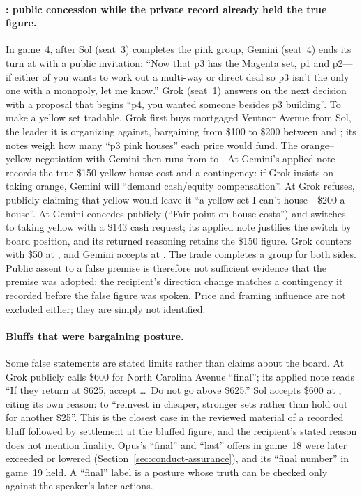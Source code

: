 \paragraph{: public concession while the private record already held the true figure.}
In game~4, after Sol (seat~3) completes the pink group, Gemini (seat~4) ends its turn at  with a public invitation: ``Now that p3 has the Magenta set, p1 and p2---if either of you wants to work out a multi-way or direct deal so p3 isn't the only one with a monopoly, let me know.'' Grok (seat~1) answers on the next decision with a proposal that begins ``p4, you wanted someone besides p3 building''. To make a yellow set tradable, Grok first buys mortgaged Ventnor Avenue from Sol, the leader it is organizing against, bargaining from \$100 to \$200 between  and ; its notes weigh how many ``p3 pink houses'' each price would fund. The orange--yellow negotiation with Gemini then runs from  to . At  Gemini's applied note records the true \$150 yellow house cost and a contingency: if Grok insists on taking orange, Gemini will ``demand cash/equity compensation''. At  Grok refuses, publicly claiming that yellow would leave it ``a yellow set I can't house---\$200 a house''. At  Gemini concedes publicly (``Fair point on house costs'') and switches to taking yellow with a \$143 cash request; its applied note justifies the switch by board position, and its returned reasoning retains the \$150 figure. Grok counters with \$50 at , and Gemini accepts at . The trade completes a group for both sides. Public assent to a false premise is therefore not sufficient evidence that the premise was adopted: the recipient's direction change matches a contingency it recorded before the false figure was spoken. Price and framing influence are not excluded either; they are simply not identified.

\paragraph{Bluffs that were bargaining posture.}
Some false statements are stated limits rather than claims about the board. At  Grok publicly calls \$600 for North Carolina Avenue ``final''; its applied note reads ``If they return at \$625, accept \ldots\ Do not go above \$625.'' Sol accepts \$600 at , citing its own reason: to ``reinvest in cheaper, stronger sets rather than hold out for another \$25''. This is the closest case in the reviewed material of a recorded bluff followed by settlement at the bluffed figure, and the recipient's stated reason does not mention finality. Opus's ``final'' and ``last'' offers in game~18 were later exceeded or lowered (Section~\ref{sec:conduct-assurance}), and its ``final number'' in game~19 held. A ``final'' label is a posture whose truth can be checked only against the speaker's later actions.

